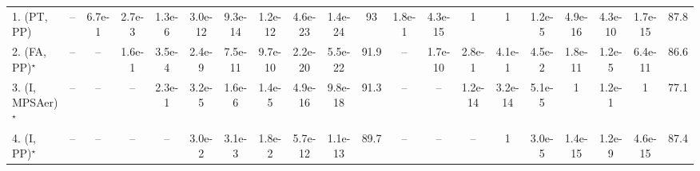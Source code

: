 \begin{table}[ht]
{\begin{tabular}{l|cccccccccc|ccccccccc|}
1. (PT, PP) & -- & 6.7e-1 & {\cellcolor[HTML]{309950}} \color[HTML]{F1F1F1} 2.7e-3 & {\cellcolor[HTML]{00441B}} \color[HTML]{F1F1F1} 1.3e-6 & {\cellcolor[HTML]{00441B}} \color[HTML]{F1F1F1} 3.0e-12 & {\cellcolor[HTML]{00441B}} \color[HTML]{F1F1F1} 9.3e-14 & {\cellcolor[HTML]{00441B}} \color[HTML]{F1F1F1} 1.2e-12 & {\cellcolor[HTML]{00441B}} \color[HTML]{F1F1F1} 4.6e-23 & {\cellcolor[HTML]{00441B}} \color[HTML]{F1F1F1} 1.4e-24 & 93 & 1.8e-1 & {\cellcolor[HTML]{00441B}} \color[HTML]{F1F1F1} 4.3e-15 & 1 & 1 & {\cellcolor[HTML]{00441B}} \color[HTML]{F1F1F1} 1.2e-5 & {\cellcolor[HTML]{00441B}} \color[HTML]{F1F1F1} 4.9e-16 & {\cellcolor[HTML]{00441B}} \color[HTML]{F1F1F1} 4.3e-10 & {\cellcolor[HTML]{00441B}} \color[HTML]{F1F1F1} 1.7e-15 & 87.8 \\
2. (FA, PP)$^\star$ & -- & -- & 1.6e-1 & {\cellcolor[HTML]{00441B}} \color[HTML]{F1F1F1} 3.5e-4 & {\cellcolor[HTML]{00441B}} \color[HTML]{F1F1F1} 2.4e-9 & {\cellcolor[HTML]{00441B}} \color[HTML]{F1F1F1} 7.5e-11 & {\cellcolor[HTML]{00441B}} \color[HTML]{F1F1F1} 9.7e-10 & {\cellcolor[HTML]{00441B}} \color[HTML]{F1F1F1} 2.2e-20 & {\cellcolor[HTML]{00441B}} \color[HTML]{F1F1F1} 5.5e-22 & 91.9 & -- & {\cellcolor[HTML]{00441B}} \color[HTML]{F1F1F1} 1.7e-10 & 2.8e-1 & 4.1e-1 & {\cellcolor[HTML]{B5E1AE}} \color[HTML]{000000} 4.5e-2 & {\cellcolor[HTML]{00441B}} \color[HTML]{F1F1F1} 1.8e-11 & {\cellcolor[HTML]{00441B}} \color[HTML]{F1F1F1} 1.2e-5 & {\cellcolor[HTML]{00441B}} \color[HTML]{F1F1F1} 6.4e-11 & 86.6 \\
3. (I, MPSAer)$^\star$ & -- & -- & -- & 2.3e-1 & {\cellcolor[HTML]{00441B}} \color[HTML]{F1F1F1} 3.2e-5 & {\cellcolor[HTML]{00441B}} \color[HTML]{F1F1F1} 1.6e-6 & {\cellcolor[HTML]{00441B}} \color[HTML]{F1F1F1} 1.4e-5 & {\cellcolor[HTML]{00441B}} \color[HTML]{F1F1F1} 4.9e-16 & {\cellcolor[HTML]{00441B}} \color[HTML]{F1F1F1} 9.8e-18 & 91.3 & -- & -- & {\cellcolor[HTML]{00441B}} \color[HTML]{F1F1F1} 1.2e-14 & {\cellcolor[HTML]{00441B}} \color[HTML]{F1F1F1} 3.2e-14 & {\cellcolor[HTML]{00441B}} \color[HTML]{F1F1F1} 5.1e-5 & 1 & 1.2e-1 & 1 & 77.1 \\
4. (I, PP)$^\star$ & -- & -- & -- & -- & {\cellcolor[HTML]{B5E1AE}} \color[HTML]{000000} 3.0e-2 & {\cellcolor[HTML]{309950}} \color[HTML]{F1F1F1} 3.1e-3 & {\cellcolor[HTML]{B5E1AE}} \color[HTML]{000000} 1.8e-2 & {\cellcolor[HTML]{00441B}} \color[HTML]{F1F1F1} 5.7e-12 & {\cellcolor[HTML]{00441B}} \color[HTML]{F1F1F1} 1.1e-13 & 89.7 & -- & -- & -- & 1 & {\cellcolor[HTML]{00441B}} \color[HTML]{F1F1F1} 3.0e-5 & {\cellcolor[HTML]{00441B}} \color[HTML]{F1F1F1} 1.4e-15 & {\cellcolor[HTML]{00441B}} \color[HTML]{F1F1F1} 1.2e-9 & {\cellcolor[HTML]{00441B}} \color[HTML]{F1F1F1} 4.6e-15 & 87.4 \\

\end{tabular}}
\end{table}
